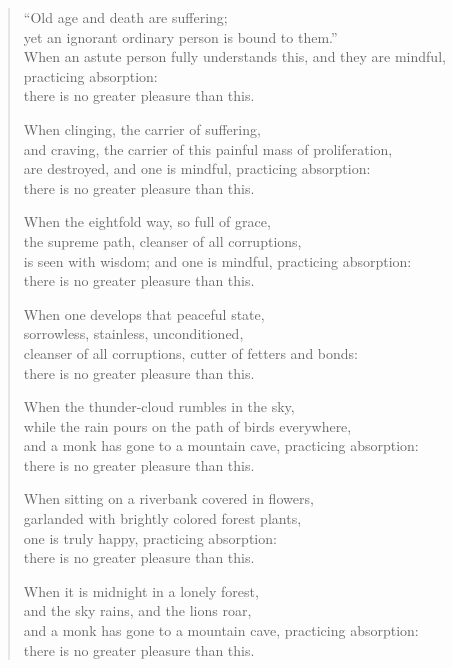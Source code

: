 \documentclass[12pt,openany]{book}%
\begin{document}
\begin{verse}%
“Old age and death are suffering; \\
yet an ignorant ordinary person is bound to them.” \\
When an astute person fully understands this, and they are mindful, practicing absorption: \\
there is no greater pleasure than this. 

When clinging, the carrier of suffering, \\
and craving, the carrier of this painful mass of proliferation, \\
are destroyed, and one is mindful, practicing absorption: \\
there is no greater pleasure than this. 

When the eightfold way, so full of grace, \\
the supreme path, cleanser of all corruptions, \\
is seen with wisdom; and one is mindful, practicing absorption: \\
there is no greater pleasure than this. 

When one develops that peaceful state, \\
sorrowless, stainless, unconditioned, \\
cleanser of all corruptions, cutter of fetters and bonds: \\
there is no greater pleasure than this. 

When the thunder-cloud rumbles in the sky, \\
while the rain pours on the path of birds everywhere, \\
and a monk has gone to a mountain cave, practicing absorption: \\
there is no greater pleasure than this. 

When sitting on a riverbank covered in flowers, \\
garlanded with brightly colored forest plants, \\
one is truly happy, practicing absorption: \\
there is no greater pleasure than this. 

When it is midnight in a lonely forest, \\
and the sky rains, and the lions roar, \\
and a monk has gone to a mountain cave, practicing absorption: \\
there is no greater pleasure than this. 


\end{verse}
\end{document}
